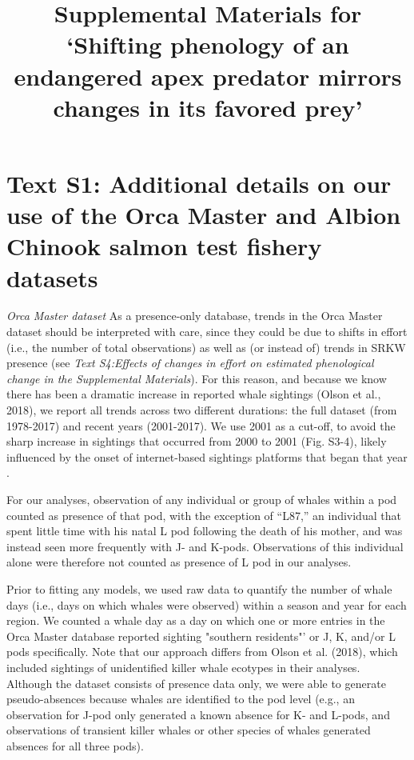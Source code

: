 \documentclass{article}
\begin{document}



\title{Supplemental Materials for `Shifting phenology of an endangered apex predator mirrors changes in its favored prey'}
\date{ }
\maketitle
\author{}
\newcommand{\dd}[1]{\mathrm{d}#1}
\renewcommand{\thetable}{S\arabic{table}}
\renewcommand{\thefigure}{S\arabic{figure}}
\section*{Text S1: Additional details on our use of the Orca Master and Albion Chinook salmon test fishery datasets}
\emph{Orca Master dataset}
As a presence-only database, trends in the Orca Master dataset should be interpreted with care, since they could be due to shifts in effort (i.e., the number of total observations) as well as (or instead of) trends in SRKW presence (see \textit{Text S4:Effects of changes in effort on estimated phenological change in the Supplemental Materials}). For this reason, and because we know there has been a dramatic increase in reported whale sightings (Olson et al., 2018), we report all trends across two different durations: the full dataset (from 1978-2017) and recent years (2001-2017). We use 2001 as a cut-off, to avoid the sharp increase in sightings that occurred from 2000 to 2001 (Fig. S3-4), likely influenced by the onset of internet-based sightings platforms that began that year \citep{hauser2007,olson2018}.

For our analyses, observation of any individual or group of whales within a pod counted as presence of that pod, with the exception of ``L87,'' an individual that spent little time with his natal L pod following the death of his mother, and was instead seen more frequently with J- and K-pods. Observations of this individual alone were therefore not counted as presence of L pod in our analyses.

Prior to fitting any models, we used raw data to quantify the number of whale days (i.e., days on which whales were observed) within a season and year for each region. We counted a whale day as a day on which one or more entries in the Orca Master database reported sighting "southern residents"' or J, K, and/or L pods specifically. Note that our approach differs from Olson et al. (2018), which included sightings of unidentified killer whale ecotypes in their analyses. Although the dataset consists of presence data only, we were able to generate pseudo-absences because whales are identified to the pod level (e.g., an observation for J-pod only generated a known absence for K- and L-pods, and observations of transient killer whales or other species of whales generated absences for all three pods).
\end{document}
